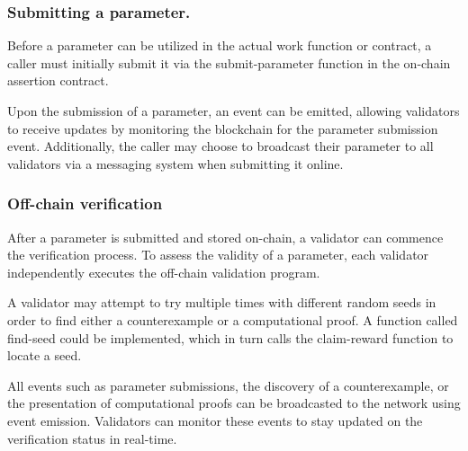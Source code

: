 \documentclass[runningheads]{llncs}
\begin{document}
\subsubsection{Submitting a parameter.} %
Before a parameter can be utilized in the actual work function or contract, a caller must initially submit it via the submit-parameter function in the on-chain assertion contract. %

Upon the submission of a parameter, an event can be emitted, allowing validators to receive updates by monitoring the blockchain for the parameter submission event. Additionally, the caller may choose to broadcast their parameter to all validators via a messaging system when submitting it online.
\subsubsection{Off-chain verification}
After a parameter is submitted and stored on-chain, a validator can commence the verification process. To assess the validity of a parameter, each validator independently executes the off-chain validation program.

A validator may attempt to try multiple times with different random seeds in order to find either a counterexample or a computational proof. %
A function called find-seed could be implemented, which in turn calls the claim-reward function to locate a seed.

All events such as parameter submissions, the discovery of a counterexample, or the presentation of computational proofs can be broadcasted to the network using event emission. Validators can monitor these events to stay updated on the verification status in real-time. 
\end{document}
